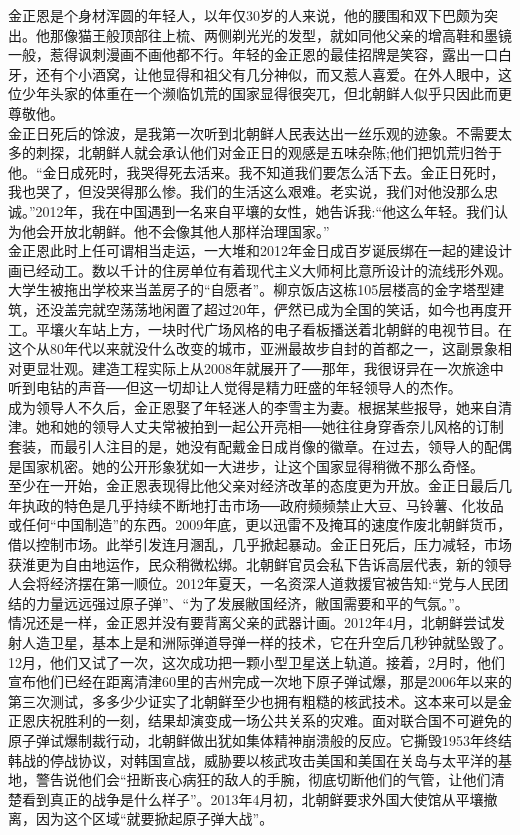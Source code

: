 金正恩是个身材浑圆的年轻人，以年仅30岁的人来说，他的腰围和双下巴颇为突出。他那像猫王般顶部往上梳、两侧剃光光的发型，就如同他父亲的增高鞋和墨镜一般，惹得讽刺漫画不画他都不行。年轻的金正恩的最佳招牌是笑容，露出一口白牙，还有个小酒窝，让他显得和祖父有几分神似，而又惹人喜爱。在外人眼中，这位少年头家的体重在一个濒临饥荒的国家显得很突兀，但北朝鲜人似乎只因此而更尊敬他。\\

金正日死后的馀波，是我第一次听到北朝鲜人民表达出一丝乐观的迹象。不需要太多的刺探，北朝鲜人就会承认他们对金正日的观感是五味杂陈;他们把饥荒归咎于他。“金日成死时，我哭得死去活来。我不知道我们要怎么活下去。金正日死时，我也哭了，但没哭得那么惨。我们的生活这么艰难。老实说，我们对他没那么忠诚。”2012年，我在中国遇到一名来自平壤的女性，她告诉我:“他这么年轻。我们认为他会开放北朝鲜。他不会像其他人那样治理国家。”\\

金正恩此时上任可谓相当走运，一大堆和2012年金日成百岁诞辰绑在一起的建设计画已经动工。数以千计的住房单位有着现代主义大师柯比意所设计的流线形外观。大学生被拖出学校来当盖房子的“自愿者”。柳京饭店这栋105层楼高的金字塔型建筑，还没盖完就空荡荡地闲置了超过20年，俨然已成为全国的笑话，如今也再度开工。平壤火车站上方，一块时代广场风格的电子看板播送着北朝鲜的电视节目。在这个从80年代以来就没什么改变的城市，亚洲最故步自封的首都之一，这副景象相对更显壮观。建造工程实际上从2008年就展开了──那年，我很讶异在一次旅途中听到电钻的声音──但这一切却让人觉得是精力旺盛的年轻领导人的杰作。\\

成为领导人不久后，金正恩娶了年轻迷人的李雪主为妻。根据某些报导，她来自清津。她和她的领导人丈夫常被拍到一起公开亮相──她往往身穿香奈儿风格的订制套装，而最引人注目的是，她没有配戴金日成肖像的徽章。在过去，领导人的配偶是国家机密。她的公开形象犹如一大进步，让这个国家显得稍微不那么奇怪。\\

至少在一开始，金正恩表现得比他父亲对经济改革的态度更为开放。金正日最后几年执政的特色是几乎持续不断地打击市场──政府频频禁止大豆、马铃薯、化妆品或任何“中国制造”的东西。2009年底，更以迅雷不及掩耳的速度作废北朝鲜货币，借以控制市场。此举引发连月溷乱，几乎掀起暴动。金正日死后，压力减轻，市场获淮更为自由地运作，民众稍微松绑。北朝鲜官员会私下告诉高层代表，新的领导人会将经济摆在第一顺位。2012年夏天，一名资深人道救援官被告知:“党与人民团结的力量远远强过原子弹”、“为了发展敝国经济，敝国需要和平的气氛。”。\\

情况还是一样，金正恩并没有要背离父亲的武器计画。2012年4月，北朝鲜尝试发射人造卫星，基本上是和洲际弹道导弹一样的技术，它在升空后几秒钟就坠毁了。12月，他们又试了一次，这次成功把一颗小型卫星送上轨道。接着，2月时，他们宣布他们已经在距离清津60里的吉州完成一次地下原子弹试爆，那是2006年以来的第三次测试，多多少少证实了北朝鲜至少也拥有粗糙的核武技术。这本来可以是金正恩庆祝胜利的一刻，结果却演变成一场公共关系的灾难。面对联合国不可避免的原子弹试爆制裁行动，北朝鲜做出犹如集体精神崩溃般的反应。它撕毁1953年终结韩战的停战协议，对韩国宣战，威胁要以核武攻击美国和美国在关岛与太平洋的基地，警告说他们会“扭断丧心病狂的敌人的手腕，彻底切断他们的气管，让他们清楚看到真正的战争是什么样子”。2013年4月初，北朝鲜要求外国大使馆从平壤撤离，因为这个区域“就要掀起原子弹大战”。\\


